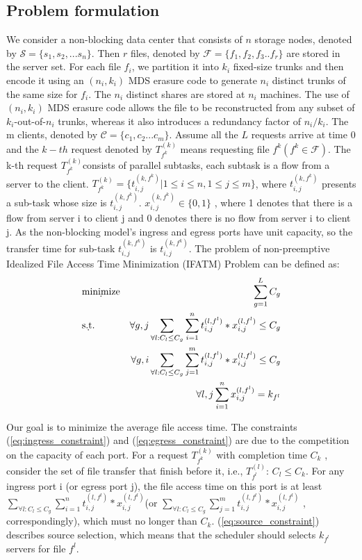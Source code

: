 \documentclass{IEEEtran}
\begin{document}
\subsection{Problem formulation}
We consider a non-blocking data center that consists of $n$  storage nodes, denoted by $\mathcal{S} = \{s_1,s_2,...s_n\}$.
Then $r$ files, denoted by $\mathcal{F}=\{f_1,f_2,f_3..f_r\}$ are stored in the server set.
For each file $f_i$, we partition it into $k_i$ fixed-size trunks and then encode it 
using an $(n_i,k_i)$ MDS erasure code to generate $n_i $ distinct trunks of the same size for $f_i$.
The $n_i$ distinct shares are stored at $n_i$ machines.
The use of $(n_i, k_i)$ MDS erasure code allows the file to be reconstructed from any subset of $k_i$-out-of-$n_i$ trunks, 
whereas it also introduces a redundancy factor of $n_i / k_i$.
The m clients, denoted by $\mathcal{C}=\{c_1,c_2...c_m\}$.
Assume all the $L$ requests arrive at time 0 and the $k-th$ request denoted by $T^{(k)}_{f^k}$ means requesting file $f^k(f^k\in \mathcal{F})$.
The k-th request $T^{(k)}_{f^k} $consists of parallel subtasks, each subtask is a flow from a server to the client.
$T^{(k)}_{f^k}=\{t_{i,j}^{(k,f^k)}|1 \le i \le n ,1\le j \le m\}$, where $t_{i,j}^{(k,f^k)}$ presents a sub-task whose size is $t_{i,j}^{(k,f^k)}$.
$x^{(k,f^k)}_{i,j}  \in \{0,1\}$ , where 1 denotes that there is a flow from server i to client j and 0 denotes there is no flow  from server i to client j.
As the non-blocking model's ingress and egress ports have unit capacity,
so the transfer time for sub-task $t_{i,j}^{(k,f^k)}$ is  $t_{i,j}^{(k,f^k)}$.
The problem of non-preemptive Idealized File Access Time Minimization (IFATM) Problem can be defined as:
 \begin{eqnarray}
&\d {\rm minimize} & \sum_{g=1}^{L} C_{g} \label{eq:ECSF-SC} \\
& \d{\rm s.t.} &\forall g,j\sum_{\forall l:C_l \leq C_g}\sum_{i=1}^{n}t_{i,j}^{(l,f^l)}*x_{i,j}^{(l,f^l)}\leq C_g  \label{eq:ingress_constraint}\\
&&\forall g,i\sum_{\forall l:C_l \leq C_g}\sum_{j=1}^{m}t_{i,j}^{(l,f^l)}*x_{i,j} ^{(l,f^l)} \leq C_g   \label{eq:egress_constraint}\\
&& \forall l,j\sum_{i=1}^nx_{i,j}^{(l,f^l)}=k_{f^l}  \label{eq:source_constraint}
\end{eqnarray}

Our goal is to minimize the average file access time. 
The constraints (\ref{eq:ingress_constraint}) and (\ref{eq:egress_constraint}) are due to the competition on the capacity of each port. 
For a request $T^{(k)}_{f^k}$ with completion time $C_{k}$ , consider the set of file transfer that finish before it, i.e., $T^{(l)}_{f^l}$: $C_{l} \le C_{k}$. For any ingress port i (or egress port j), the file access time on this port is at least  $\sum_{\forall l:C_l \leq C_g}\sum_{i=1}^{n}t_{i,j}^{(l,f^l)}*x_{i,j}^{(l,f^l)}$(or  $\sum_{\forall l:C_l \leq C_g}\sum_{j=1}^{m}t_{i,j}^{(l,f^l)}*x_{i,j} ^{(l,f^l)}$ , correspondingly), which must no longer than $C_{k}$.
(\ref{eq:source_constraint}) describes source selection, which means that the scheduler should selects $k_{f^l}$ servers for file ${f^l}$. 
\end{document}
